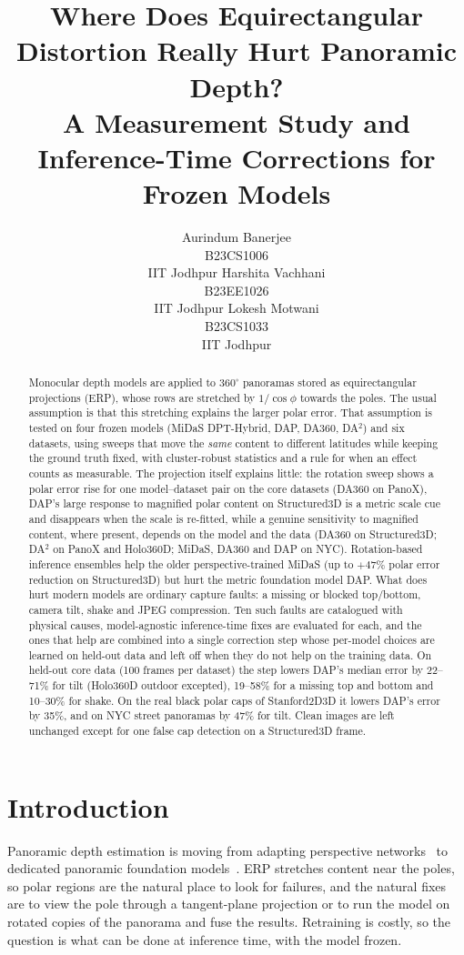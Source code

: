 \documentclass{article}
\title{Where Does Equirectangular Distortion Really Hurt Panoramic Depth? \\
A Measurement Study and Inference-Time Corrections for Frozen Models}
\author{Aurindum Banerjee \\ B23CS1006 \\ IIT Jodhpur \And Harshita Vachhani \\ B23EE1026 \\ IIT Jodhpur \And Lokesh Motwani \\ B23CS1033 \\ IIT Jodhpur}
\begin{document}
\maketitle

\begin{abstract}
Monocular depth models are applied to $360^\circ$ panoramas stored as equirectangular projections (ERP), whose rows are stretched by $1/\cos\phi$ towards the poles. The usual assumption is that this stretching explains the larger polar error. That assumption is tested on four frozen models (MiDaS DPT-Hybrid, DAP, DA360, DA$^2$) and six datasets, using sweeps that move the \emph{same} content to different latitudes while keeping the ground truth fixed, with cluster-robust statistics and a rule for when an effect counts as measurable. The projection itself explains little: the rotation sweep shows a polar error rise for one model--dataset pair on the core datasets (DA360 on PanoX), DAP's large response to magnified polar content on Structured3D is a metric scale cue and disappears when the scale is re-fitted, while a genuine sensitivity to magnified content, where present, depends on the model and the data (DA360 on Structured3D; DA$^2$ on PanoX and Holo360D; MiDaS, DA360 and DAP on NYC). Rotation-based inference ensembles help the older perspective-trained MiDaS (up to $+47\%$ polar error reduction on Structured3D) but hurt the metric foundation model DAP. What does hurt modern models are ordinary capture faults: a missing or blocked top/bottom, camera tilt, shake and JPEG compression. Ten such faults are catalogued with physical causes, model-agnostic inference-time fixes are evaluated for each, and the ones that help are combined into a single correction step whose per-model choices are learned on held-out data and left off when they do not help on the training data. On held-out core data (100 frames per dataset) the step lowers DAP's median error by 22--71\% for tilt (Holo360D outdoor excepted), 19--58\% for a missing top and bottom and 10--30\% for shake. On the real black polar caps of Stanford2D3D it lowers DAP's error by 35\%, and on NYC street panoramas by 47\% for tilt. Clean images are left unchanged except for one false cap detection on a Structured3D frame.
\end{abstract}

\section{Introduction}
Panoramic depth estimation is moving from adapting perspective networks~\cite{rey2022360monodepth,wang2024depthanywhere} to dedicated panoramic foundation models~\cite{zhu2024panda,guo2025dac,lin2025dap,jiang2025da360}. ERP stretches content near the poles, so polar regions are the natural place to look for failures, and the natural fixes are to view the pole through a tangent-plane projection or to run the model on rotated copies of the panorama and fuse the results. Retraining is costly, so the question is what can be done at inference time, with the model frozen.
\end{document}
